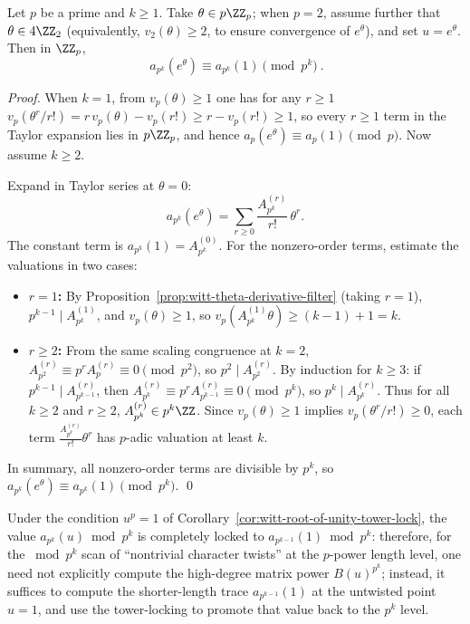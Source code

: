 \begin{corollary}[\texorpdfstring{$p$}{p}-adic flatness ball: \texorpdfstring{$p^k$}{p^k}-insensitivity of \texorpdfstring{$u=e^\theta$}{u=exp(theta)} near \texorpdfstring{$u=1$}{u=1}]\label{cor:witt-padic-flatness-ball}
Let \(p\) be a prime and \(k\ge 1\). Take \(\theta\in p\ZZ_p\); when \(p=2\), assume further that \(\theta\in 4\ZZ_2\) (equivalently, \(v_2(\theta)\ge 2\), to ensure convergence of \(e^\theta\)), and set \(u=e^\theta\).
Then in \(\ZZ_p\),
\[
\boxed{\ a_{p^k}(e^\theta)\equiv a_{p^k}(1)\pmod{p^k}\ }.
\]
\end{corollary}
\begin{proof}
When \(k=1\), from \(v_p(\theta)\ge 1\) one has for any \(r\ge 1\)
\(
v_p(\theta^r/r!)=r\,v_p(\theta)-v_p(r!)\ge r-v_p(r!)\ge 1
\),
so every \(r\ge 1\) term in the Taylor expansion lies in \(p\ZZ_p\), and hence
\(
a_p(e^\theta)\equiv a_p(1)\pmod p
\).
Now assume \(k\ge 2\).

Expand in Taylor series at \(\theta=0\):
\[
a_{p^k}(e^\theta)=\sum_{r\ge 0}\frac{A_{p^k}^{(r)}}{r!}\,\theta^r.
\]
The constant term is \(a_{p^k}(1)=A_{p^k}^{(0)}\). For the nonzero-order terms, estimate the valuations in two cases:
\begin{itemize}
  \item \textbf{\(r=1\):} By Proposition~\ref{prop:witt-theta-derivative-filter} (taking \(r=1\)), \(p^{k-1}\mid A_{p^k}^{(1)}\), and \(v_p(\theta)\ge 1\), so
  \(v_p(A_{p^k}^{(1)}\theta)\ge (k-1)+1=k\).
  \item \textbf{\(r\ge 2\):} From the same scaling congruence at \(k=2\),
  \(A_{p^2}^{(r)}\equiv p^rA_{p}^{(r)}\equiv 0\pmod{p^2}\), so \(p^2\mid A_{p^2}^{(r)}\).
  By induction for \(k\ge 3\): if \(p^{k-1}\mid A_{p^{k-1}}^{(r)}\), then
  \(A_{p^k}^{(r)}\equiv p^rA_{p^{k-1}}^{(r)}\equiv 0\pmod{p^k}\), so \(p^k\mid A_{p^k}^{(r)}\).
  Thus for all \(k\ge 2\) and \(r\ge 2\), \(A_{p^k}^{(r)}\in p^k\ZZ\). Since \(v_p(\theta)\ge 1\) implies \(v_p(\theta^r/r!)\ge 0\), each term \(\frac{A_{p^k}^{(r)}}{r!}\theta^r\) has \(p\)-adic valuation at least \(k\).
\end{itemize}
In summary, all nonzero-order terms are divisible by \(p^k\), so \(a_{p^k}(e^\theta)\equiv a_{p^k}(1)\pmod{p^k}\). \qed
\end{proof}

\begin{remark}\label{rem:witt-root-of-unity-acceleration}
Under the condition \(u^p=1\) of Corollary~\ref{cor:witt-root-of-unity-tower-lock}, the value
\(
a_{p^k}(u)\bmod p^k
\)
is completely locked to
\(
a_{p^{k-1}}(1)\bmod p^k
\):
therefore, for the \(\bmod p^k\) scan of ``nontrivial character twists'' at the \(p\)-power length level, one need not explicitly compute the high-degree matrix power
\(
B(u)^{p^k}
\);
instead, it suffices to compute the shorter-length trace \(a_{p^{k-1}}(1)\) at the untwisted point \(u=1\), and use the tower-locking to promote that value back to the \(p^k\) level.
\end{remark}

